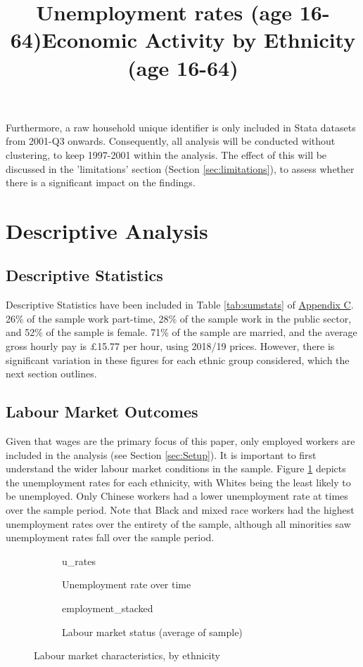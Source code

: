 \documentclass[class=article, crop=false]{standalone}
\begin{document}
Furthermore, a raw household unique identifier is only included in Stata datasets from 2001-Q3 onwards. Consequently, all analysis will be conducted without clustering, to keep 1997-2001 within the analysis. The effect of this will be discussed in the 'limitations' section (Section \ref{sec:limitations}), to assess whether there is a significant impact on the findings.

\section{Descriptive Analysis}
\label{sec:Descriptive Analysis}
\subsection{Descriptive Statistics}
\label{sec:Descriptive Statistics}
Descriptive Statistics have been included in Table \ref{tab:sumstats} of \hyperref[sec:appendixC]{Appendix C}. 26\% of the sample work part-time, 28\% of the sample work in the public sector, and 52\% of the sample is female. 71\% of the sample are married, and the average gross hourly pay is £15.77 per hour, using 2018/19 prices. However, there is significant variation in these figures for each ethnic group considered, which the next section outlines.

\subsection{Labour Market Outcomes}
\label{sec:Labour Market Outcomes}
Given that wages are the primary focus of this paper, only employed workers are included in the analysis (see Section \ref{sec:Setup}). It is important to first understand the wider labour market conditions in the sample. Figure \ref{fig:u_rates} depicts the unemployment rates for each ethnicity, with Whites being the least likely to be unemployed. Only Chinese workers had a lower unemployment rate at times over the sample period. Note that Black and mixed race workers had the highest unemployment rates over the entirety of the sample, although all minorities saw unemployment rates fall over the sample period.
\begin{figure}[h]
\begin{subfigure}{0.5\textwidth}
\centering
    \title{Unemployment rates (age 16-64)}
    {u_rates}
    \caption{Unemployment rate over time}
    \label{fig:u_rates}
\end{subfigure}
\begin{subfigure}{0.5\textwidth}
\centering
    \title{Economic Activity by Ethnicity (age 16-64)}
    {employment_stacked}
    \caption{Labour market status (average of sample)}
    \label{fig:employment_stacked}
\end{subfigure}
\caption{Labour market characteristics, by ethnicity}
\label{fig:labour_market}
\end{figure}
\end{document}
